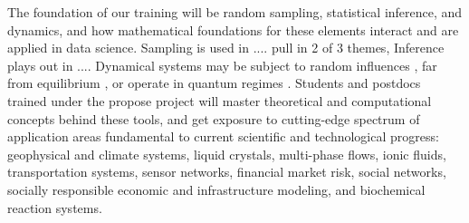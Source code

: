 \documentclass[11pt]{NSFamsart}
\begin{document}
The foundation of our training will be random sampling, statistical inference, and dynamics, and how mathematical foundations for these elements interact and are applied in data science. 
Sampling is used in .... {\color{magenta}pull in 2 of 3 themes}, Inference plays out in ....  Dynamical systems may be subject to random influences \cite{Arnold, DuanBook2015}, far from equilibrium \cite{liu2009introduction}, or operate in quantum regimes \cite{Dittrich2016}. 
Students and postdocs trained under the propose project will master theoretical and computational concepts behind these tools, and get exposure to cutting-edge spectrum of application areas fundamental to current scientific and technological progress: geophysical and climate systems, liquid crystals, multi-phase flows, ionic fluids,  transportation systems, sensor networks, financial market risk, social networks, socially responsible economic and infrastructure modeling, and biochemical reaction systems. 
\end{document}

